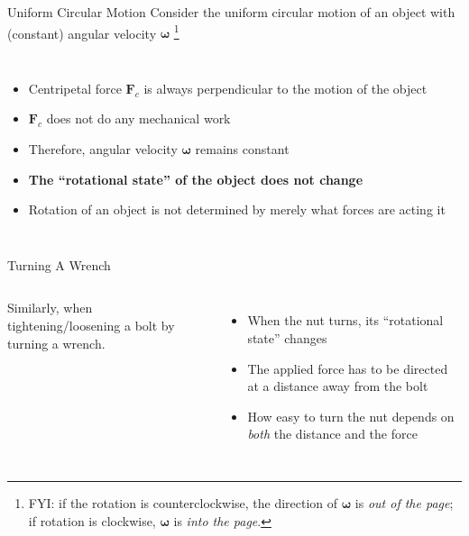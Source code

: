 \documentclass[12pt,compress,aspectratio=169]{beamer}
\begin{document}
\begin{frame}{Uniform Circular Motion}
  Consider the uniform circular motion of an object with (constant)
  angular velocity $\bm\omega$ \footnote{FYI: if the rotation is
    counterclockwise, the direction of $\bm\omega$ is \emph{out of the page};
    if rotation is clockwise, $\bm\omega$ is \emph{into the page}.}
  \begin{columns}
    \centering

    \begin{itemize}
    \item Centripetal force $\bm{F}_c$ is always perpendicular to the
      motion of the object
    \item $\bm{F}_c$ does not do any mechanical work
    \item Therefore, angular velocity $\bm\omega$ remains constant
    \item\textbf{The ``rotational state'' of the object does not change}
    \item Rotation of an object is not determined by merely what forces are
      acting it
    \end{itemize}
  \end{columns}
\end{frame}



\begin{frame}{Turning A Wrench}
  \begin{columns}
    
    Similarly, when tightening/loosening a bolt by turning a wrench.
    \begin{itemize}
    \item When the nut turns, its ``rotational state'' changes
    \item The applied force has to be directed at a distance away from the
      bolt
    \item How easy to turn the nut depends on \emph{both} the distance and the
      force
    \end{itemize}
  \end{columns}
\end{frame}
\end{document}
